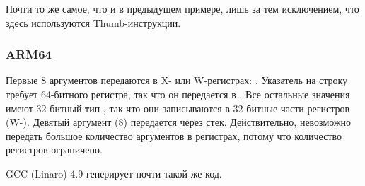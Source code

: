 Почти то же самое, что и в предыдущем примере,
лишь за тем исключением, что здесь используются Thumb-инструкции.


\subsubsection{ARM64}




Первые 8 аргументов передаются в X- или W-регистрах: \cite{ARM64_PCS}.
Указатель на строку требует 64-битного регистра, так что он передается в .
Все остальные значения имеют 32-битный тип \Tint, так что они записываются в 32-битные части регистров (W-).
Девятый аргумент (8) передается через стек.
Действительно, невозможно передать большое количество аргументов в регистрах, потому что количество регистров ограничено.

\Optimizing GCC (Linaro) 4.9 генерирует почти такой же код.

